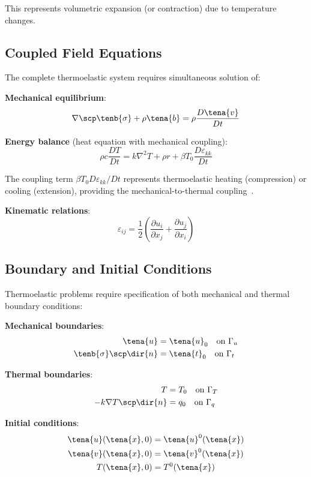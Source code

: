 This represents volumetric expansion (or contraction) due to temperature changes.

\subsection{Coupled Field Equations}

The complete thermoelastic system requires simultaneous solution of:

\textbf{Mechanical equilibrium}:
\begin{equation}
\nabla \scp \tenb{\sigma} + \rho \tena{b} = \rho \frac{D\tena{v}}{Dt}
\end{equation}

\textbf{Energy balance} (heat equation with mechanical coupling):
\begin{equation}
\rho c \frac{DT}{Dt} = k \nabla^2 T + \rho r + \beta T_0 \frac{D\varepsilon_{kk}}{Dt}
\end{equation}

The coupling term $\beta T_0 D\varepsilon_{kk}/Dt$ represents thermoelastic heating (compression) or cooling (extension), providing the mechanical-to-thermal coupling~\autocite{Sadd.2019}.

\textbf{Kinematic relations}:
\begin{equation}
\varepsilon_{ij} = \frac{1}{2}\left(\frac{\partial u_i}{\partial x_j} + \frac{\partial u_j}{\partial x_i}\right)
\end{equation}

\subsection{Boundary and Initial Conditions}

Thermoelastic problems require specification of both mechanical and thermal boundary conditions:

\textbf{Mechanical boundaries}:
\begin{align}
\tena{u} &= \tena{u}_0 \quad \text{on } \Gamma_u\\
\tenb{\sigma} \scp \dir{n} &= \tena{t}_0 \quad \text{on } \Gamma_t
\end{align}

\textbf{Thermal boundaries}:
\begin{align}
T &= T_0 \quad \text{on } \Gamma_T\\
-k \nabla T \scp \dir{n} &= q_0 \quad \text{on } \Gamma_q
\end{align}

\textbf{Initial conditions}:
\begin{align}
\tena{u}(\tena{x}, 0) &= \tena{u}^0(\tena{x})\\
\tena{v}(\tena{x}, 0) &= \tena{v}^0(\tena{x})\\
T(\tena{x}, 0) &= T^0(\tena{x})
\end{align}


